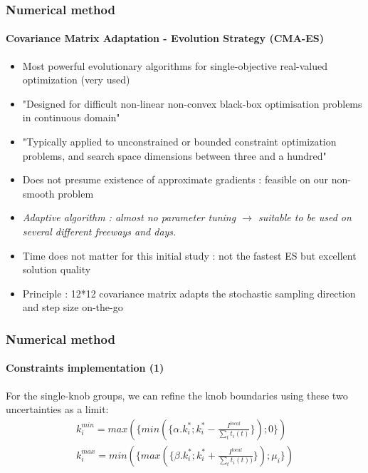 \documentclass[fleqn]{beamer}
\begin{document}
\begin{frame}
	\frametitle{Numerical method}
	\framesubtitle{Covariance Matrix Adaptation - Evolution Strategy (CMA-ES)}
	\begin{itemize}
		\item Most powerful evolutionary algorithms for single-objective real-valued optimization (very used) 
		\item "Designed for difficult non-linear non-convex black-box optimisation problems in continuous domain"
		\item "Typically applied to unconstrained or bounded constraint optimization problems, and search space dimensions between three and a hundred"
		\item Does not presume existence of approximate gradients : feasible on our non-smooth problem
		\item \em Adaptive \em algorithm : almost no parameter tuning $\rightarrow$ suitable to be used on several different freeways and days.
		\item Time does not matter for this initial study : not the fastest ES but excellent solution quality 
		\item Principle : 12*12 covariance matrix adapts the stochastic sampling direction and step size on-the-go 	
	\end{itemize}
\end{frame}


\begin{frame}
	\frametitle{Numerical method}
	\framesubtitle{Constraints implementation (1)}
	For the single-knob groups, we can refine the knob boundaries using these two uncertainties as a limit:
\begin{equation*}
	\begin{split}
		k_{i}^{min}=max(\{min(\{\alpha.k_i^{*};k_{i}^{*}-\frac{I^{local}}{\sum_{t} t_{i}(t)}\});0\}) \\ 
		k_{i}^{max}=min(\{max(\{\beta.k_i^{*};k_{i}^{*}+\frac{I^{local}}{\sum_{t} t_{i}(t))}\});\mu_{i}\})
	\end{split}	
\end{equation*}
\end{frame}
\end{document}
